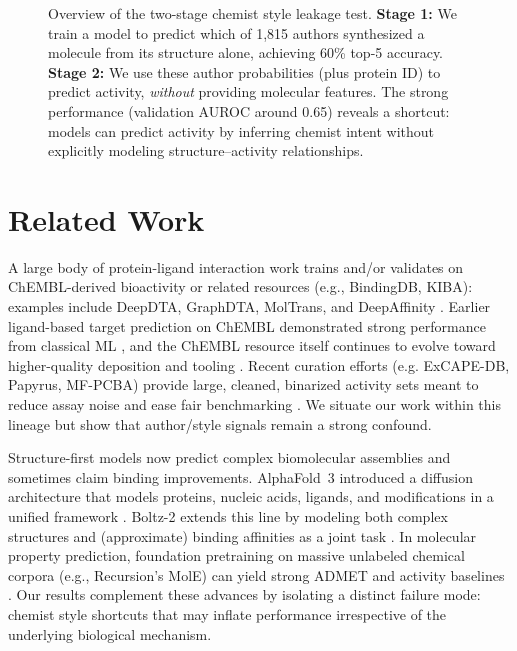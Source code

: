 \documentclass[11pt]{article}
\begin{document}
\begin{figure}[t]
\caption{Overview of the two-stage chemist style leakage test. \textbf{Stage 1:} We train a model to predict which of 1,815 authors synthesized a molecule from its structure alone, achieving 60\% top-5 accuracy. \textbf{Stage 2:} We use these author probabilities (plus protein ID) to predict activity, \emph{without} providing molecular features. The strong performance (validation AUROC around 0.65) reveals a shortcut: models can predict activity by inferring chemist intent without explicitly modeling structure--activity relationships.}
\label{fig:overview}
\end{figure}

\section{Related Work}

A large body of protein-ligand interaction work trains and/or validates on ChEMBL-derived bioactivity or related resources (e.g., BindingDB, KIBA): examples include DeepDTA, GraphDTA, MolTrans, and DeepAffinity \citep{ozturk2018deepdta,nguyen2020graphdta,huang2021moltrans,karimi2019deepaffinity}. Earlier ligand-based target prediction on ChEMBL demonstrated strong performance from classical ML \citep{koutsoukas2013chembltp,mayr2018largescale}, and the ChEMBL resource itself continues to evolve toward higher-quality deposition and tooling \citep{bento2024chembl}. Recent curation efforts (e.g. ExCAPE-DB, Papyrus, MF-PCBA) provide large, cleaned, binarized activity sets meant to reduce assay noise and ease fair benchmarking \citep{papyrus2022, sun2017excape, buterez2023mfpcba}. We situate our work within this lineage but show that author/style signals remain a strong confound.

Structure-first models now predict complex biomolecular assemblies and sometimes claim binding improvements. AlphaFold~3 introduced a diffusion architecture that models proteins, nucleic acids, ligands, and modifications in a unified framework \citep{alphafold3}. Boltz-2 extends this line by modeling both complex structures and (approximate) binding affinities as a joint task \citep{boltz2}. In molecular property prediction, foundation pretraining on massive unlabeled chemical corpora (e.g., Recursion’s MolE) can yield strong ADMET and activity baselines \citep{mole2024}. Our results complement these advances by isolating a distinct failure mode: chemist style shortcuts that may inflate performance irrespective of the underlying biological mechanism.
\end{document}
